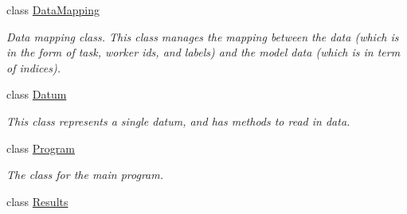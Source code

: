 \begin{DoxyCompactItemize}
class \hyperlink{class_crowdsourcing_models_1_1_data_mapping}{Data\+Mapping}
\begin{DoxyCompactList}\small\item\em Data mapping class. This class manages the mapping between the data (which is in the form of task, worker ids, and labels) and the model data (which is in term of indices). \end{DoxyCompactList}\item 
class \hyperlink{class_crowdsourcing_models_1_1_datum}{Datum}
\begin{DoxyCompactList}\small\item\em This class represents a single datum, and has methods to read in data. \end{DoxyCompactList}\item 
class \hyperlink{class_crowdsourcing_models_1_1_program}{Program}
\begin{DoxyCompactList}\small\item\em The class for the main program. \end{DoxyCompactList}\item 
class \hyperlink{class_crowdsourcing_models_1_1_results}{Results}
\end{DoxyCompactItemize}
